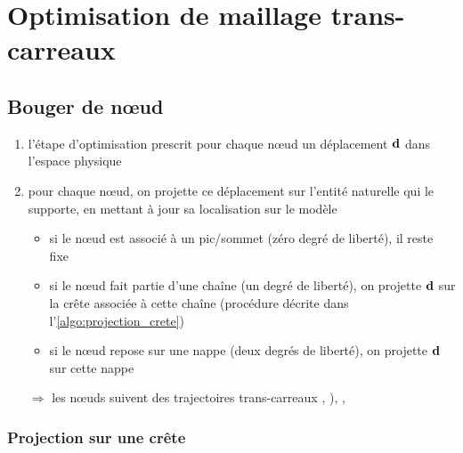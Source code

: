 \section{Optimisation de maillage trans-carreaux}

\subsection{Bouger de n\oe ud}
\label{section:projection_surface_composite}
\begin{enumerate}
	\item l'étape d'optimisation prescrit pour chaque n\oe ud un déplacement $\mathbf{d}$ dans l'espace physique
	\item pour chaque n\oe ud, on projette ce déplacement sur l'entité naturelle qui le supporte, en mettant à jour sa localisation sur le modèle \brep
	\begin{itemize}
		\item si le n\oe ud est associé à un pic/sommet (zéro degré de liberté), il reste fixe 
		\item si le n\oe ud fait partie d'une chaîne (un degré de liberté), on projette $\mathbf{d}$ sur la crête associée à cette chaîne (procédure décrite dans l'\autoref{algo:projection_crete})
		\item si le n\oe ud repose sur une nappe (deux degrés de liberté), on projette $\mathbf{d}$ sur cette nappe
	\end{itemize}
	\item[$\Rightarrow$] les n\oe uds suivent des trajectoires trans-carreaux \cite{noel1995}, \cite[Section~5.5]{foucault2008}), \cite{thompson2005}, \cite[p.42 et Section~4.4.1]{crozet2017}
\end{enumerate}

\subsubsection{Projection sur une crête}

